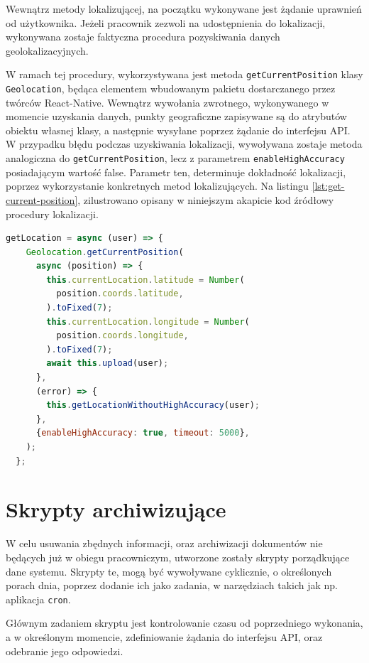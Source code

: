 Wewnątrz metody lokalizującej, na początku wykonywane jest żądanie uprawnień od użytkownika. Jeżeli pracownik zezwoli na udostępnienia do lokalizacji, wykonywana zostaje faktyczna procedura pozyskiwania danych geolokalizacyjnych.

W ramach tej procedury, wykorzystywana jest metoda \texttt{getCurrentPosition} klasy \texttt{Geolocation}, będąca elementem wbudowanym pakietu dostarczanego przez twórców React-Native. Wewnątrz wywołania zwrotnego, wykonywanego w momencie uzyskania danych, punkty geograficzne zapisywane są do atrybutów obiektu własnej klasy, a następnie wysyłane poprzez żądanie do interfejsu API. W przypadku błędu podczas uzyskiwania lokalizacji, wywoływana zostaje metoda analogiczna do \texttt{getCurrentPosition}, lecz z parametrem \texttt{enableHighAccuracy} posiadającym wartość false. Parametr ten, determinuje dokładność lokalizacji, poprzez wykorzystanie konkretnych metod lokalizujących. Na listingu \ref{lst:get-current-position}, zilustrowano opisany w niniejszym akapicie kod źródłowy procedury lokalizacji.

\begin{lstlisting}[label=lst:get-current-position,caption=Kod metody uzyskującej lokalizację urządzenia użytkownika, captionpos=b,basicstyle=\footnotesize\ttfamily,language=JavaScript]
getLocation = async (user) => {
    Geolocation.getCurrentPosition(
      async (position) => {
        this.currentLocation.latitude = Number(
          position.coords.latitude,
        ).toFixed(7);
        this.currentLocation.longitude = Number(
          position.coords.longitude,
        ).toFixed(7);
        await this.upload(user);
      },
      (error) => {
        this.getLocationWithoutHighAccuracy(user);
      },
      {enableHighAccuracy: true, timeout: 5000},
    );
  };
\end{lstlisting}

\section{Skrypty archiwizujące}
W celu usuwania zbędnych informacji, oraz archiwizacji dokumentów nie będących już w obiegu pracowniczym, utworzone zostały skrypty porządkujące dane systemu. Skrypty te, mogą być wywoływane cyklicznie, o określonych porach dnia, poprzez dodanie ich jako zadania, w narzędziach takich jak np. aplikacja \texttt{cron}.

Głównym zadaniem skryptu jest kontrolowanie czasu od poprzedniego wykonania, a w określonym momencie, zdefiniowanie żądania do interfejsu API, oraz odebranie jego odpowiedzi.

